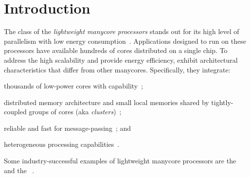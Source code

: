 \section{Introduction}
\label{sec:introduction}

	The class of the \textit{lightweight manycore processors} stands out for
	its high level of parallelism with low energy
	consumption~\cite{francesquini2015}. Applications designed to run on these
	processors have available hundreds of cores distributed on a single chip.
	To address the high scalability and provide energy efficiency, \lws exhibit
	architectural characteristics that differ from other manycores.
	Specifically, they integrate:
	\begin{enumerate*}[label=(\roman*)]
		\item thousands of low-power cores with \mimd capability~\cite{Rossi2017};
		\item distributed memory architecture and small local memories shared by
			tightly-coupled groups of cores (aka \textit{clusters})~\cite{Bohnenstiehl2017};
		\item reliable and fast \nocs for message-passing~\cite{Bohnenstiehl2017}; and
		\item heterogeneous processing capabilities~\cite{Davidson2018}.
	\end{enumerate*}
	Some industry-successful examples of lightweight manycore processors are
	the \mppa~\cite{DeDinechin2013-2} and the \epiphany~\cite{Olofsson2016}.

\iffalse
	Esses processadores introduziram junto de suas vantagens, um conjunto de
	desafios no projeto e desenvolvimento de aplicações de baíxo e alto nível
	inserido pelas suas características arquiteturais. Algumas desses desafios
	são:
	\begin{itemize}
		\item Modelo de Programação Híbrida: uso do modelo de memória
			compartilhada para explorar o paralelismo dentro dos clusters e
			aplicação do modelo de troca de mensagens para lidar com
			comunicação entre clusters através da NoC~\cite{kelly2013};

		\item Falta de suporte em hardware para coerência de cache: para
			reduzir o consumo de energia requirindo o controle explícito da
			memória~\cite{francesquini2015};.

		\item Sistem de memória restritivo: a presença de múltiplos espaços de
			endereçamento e pequenas memórias locais requer o Data Tiling
			e Prefetching seja manipulado em software~\cite{Castro2016};

		\item Configurações heterogeneas: requer a programação de componentes
			distintos, dificultando o deploy de aplicações no
			\lws~\cite{Barbalace2015}.
	\end{itemize}
\fi

